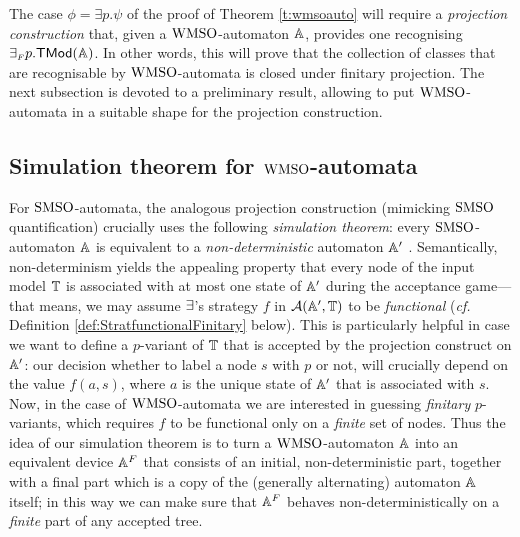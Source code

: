 {\color{blue} The case $\phi = \exists p. \psi$ of the proof of Theorem \ref{t:wmsoauto} will require a \emph{projection construction} that, given a $\mathrm{WMSO}$-automaton
$\mathbb{A}$, provides one recognising ${\exists_{{\scriptscriptstyle F}} p}.\mathsf{TMod}(\mathbb{A})$. In other words, this will  prove that 
the collection of classes that are recognisable by $\mathrm{WMSO}$-automata is closed under finitary projection. The next subsection is devoted to a preliminary result, allowing to put $\mathrm{WMSO}$-automata in a suitable shape for the projection construction.} %

\subsection{Simulation theorem for $\mathrm{WMSO}$-automata}
\label{sec:simulationwmso}

\noindent
For $\mathrm{SMSO}$-automata, the analogous projection construction {\color{blue}(mimicking $\mathrm{SMSO}$ quantification)} crucially uses the following
\emph{simulation theorem}: every $\mathrm{SMSO}$-automaton $\mathbb{A}$ is equivalent to a
\emph{non-deterministic} automaton $\mathbb{A}'$ \cite{Walukiewicz96}.
Semantically, non-determinism yields the appealing property that every node of
the input model $\mathbb{T}$ is associated with at most one state of $\mathbb{A}'$ during
the acceptance game--- that means, we may assume $\exists$'s strategy $f$ in
$\mathcal{A}(\mathbb{A}',\mathbb{T})$ to be \emph{functional} (\emph{cf.}
Definition \ref{def:StratfunctionalFinitary} below).
This is particularly helpful in case we want to define a $p$-variant of $\mathbb{T}$
that is accepted by the projection construct on $\mathbb{A}'$: our decision whether
to label a node $s$ with $p$ or not, will crucially depend on the value
$f(a,s)$, where $a$ is the unique state of $\mathbb{A}'$ that is associated with $s$.
Now, in the case of $\mathrm{WMSO}$-automata we are interested in guessing
\emph{finitary} $p$-variants, which requires $f$ to be functional only on a
\emph{finite} set of nodes.
Thus the idea of our simulation theorem is to turn a $\mathrm{WMSO}$-automaton $\mathbb{A}$
into an equivalent device $\mathbb{A}^{F}$ {\color{blue} that consists of an initial, 
non-deterministic part, together with a final part which is a copy of the 
(generally alternating) automaton $\mathbb{A}$ itself; in this way we can make sure
that $\mathbb{A}^{F}$ behaves non-deterministically on a \emph{finite} part of 
any accepted tree.}

